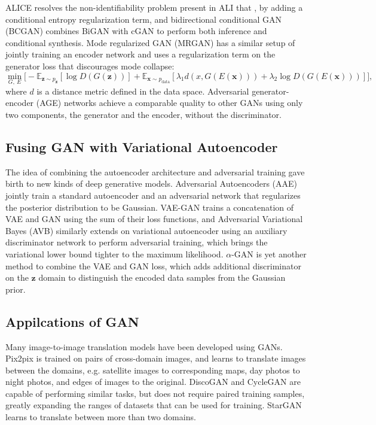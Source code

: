 ALICE \cite{li2017alice} resolves the non-identifiability problem present in ALI that , by adding a conditional entropy regularization term, and bidirectional conditional GAN (BCGAN) \cite{jaiswal2017bcgan} combines BiGAN with cGAN to perform both inference and conditional synthesis.
Mode regularized GAN (MRGAN) \cite{che2016mrgan} has a similar setup of jointly training an encoder network and uses a regularization term on the generator loss that discourages mode collapse:
\begin{equation}\label{eqn:mrgan}
\min_{G,~E} \Big[ - \mathbb{E}_{\bm{z} \sim p_{\bm{z}}} [ \log  D(G(\bm{z})) ]
+ \mathbb{E}_{\bm{x} \sim p_{\mathrm{data}}} [ \lambda_1 d(x, G(E(\bm{x}))) + \lambda_2 \log D(G(E(\bm{x}))) ] \Big],
\end{equation}
where $d$ is a distance metric defined in the data space.
Adversarial generator-encoder (AGE) networks \cite{ulyanov2017age} achieve a comparable quality to other GANs using only two components, the generator and the encoder, without the discriminator.


\subsection{Fusing GAN with Variational Autoencoder}

The idea of combining the autoencoder architecture and adversarial training gave birth to new kinds of deep generative models.
Adversarial Autoencoders (AAE) \cite{makhzani2015aae} jointly train a standard autoencoder and an adversarial network that regularizes the posterior distribution to be Gaussian.
VAE-GAN \cite{larsen2015vaegan} trains a concatenation of VAE and GAN using the sum of their loss functions, and Adversarial Variational Bayes (AVB) \cite{mescheder2017adversarial} similarly extends on variational autoencoder using an auxiliary discriminator network to perform adversarial training, which brings the variational lower bound tighter to the maximum likelihood.
$\alpha$-GAN \cite{rosca2017alphagan} is yet another method to combine the VAE and GAN loss, which adds additional discriminator on the $\bm{z}$ domain to distinguish the encoded data samples from the Gaussian prior.


\subsection{Appilcations of GAN}

Many image-to-image translation models have been developed using GANs. Pix2pix \cite{isola2016pix2pix} is trained on pairs of cross-domain images, and learns to translate images between the domains, e.g. satellite images to corresponding maps, day photos to night photos, and edges of images to the original.
DiscoGAN and CycleGAN \cite{kim2017discogan, zhu2017cyclegan} are capable of performing similar tasks, but does not require paired training samples, greatly expanding the ranges of datasets that can be used for training.
StarGAN \cite{choi2017stargan} learns to translate between more than two domains.

